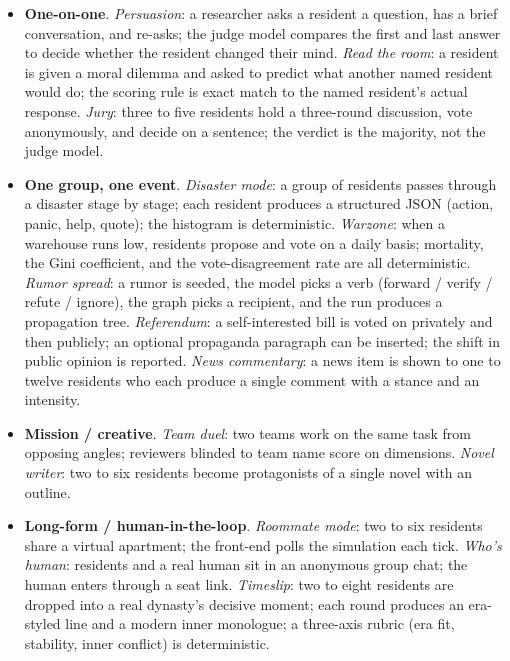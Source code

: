 \begin{itemize}[leftmargin=*]
  \item \textbf{One-on-one}.  \emph{Persuasion}: a researcher asks a
  resident a question, has a brief conversation, and re-asks; the judge
  model compares the first and last answer to decide whether the resident
  changed their mind.  \emph{Read the room}: a resident is given a moral
  dilemma and asked to predict what another named resident would do; the
  scoring rule is exact match to the named resident's actual response.
  \emph{Jury}: three to five residents hold a three-round discussion, vote
  anonymously, and decide on a sentence; the verdict is the majority, not
  the judge model.
  \item \textbf{One group, one event}.  \emph{Disaster mode}: a group of
  residents passes through a disaster stage by stage; each resident
  produces a structured JSON (action, panic, help, quote); the histogram
  is deterministic.  \emph{Warzone}: when a warehouse runs low, residents
  propose and vote on a daily basis; mortality, the Gini coefficient, and
  the vote-disagreement rate are all deterministic.  \emph{Rumor spread}: a
  rumor is seeded, the model picks a verb (forward / verify / refute /
  ignore), the graph picks a recipient, and the run produces a propagation
  tree.  \emph{Referendum}: a self-interested bill is voted on privately
  and then publicly; an optional propaganda paragraph can be inserted; the
  shift in public opinion is reported.  \emph{News commentary}: a news
  item is shown to one to twelve residents who each produce a single
  comment with a stance and an intensity.
  \item \textbf{Mission / creative}.  \emph{Team duel}: two teams work on
  the same task from opposing angles; reviewers blinded to team name score
  on dimensions.  \emph{Novel writer}: two to six residents become
  protagonists of a single novel with an outline.
  \item \textbf{Long-form / human-in-the-loop}.  \emph{Roommate mode}:
  two to six residents share a virtual apartment; the front-end polls
  the simulation each tick.  \emph{Who's human}: residents and a real
  human sit in an anonymous group chat; the human enters through a seat
  link.  \emph{Timeslip}: two to eight residents are dropped into a real
  dynasty's decisive moment; each round produces an era-styled line and a
  modern inner monologue; a three-axis rubric (era fit, stability, inner
  conflict) is deterministic.
\end{itemize}

